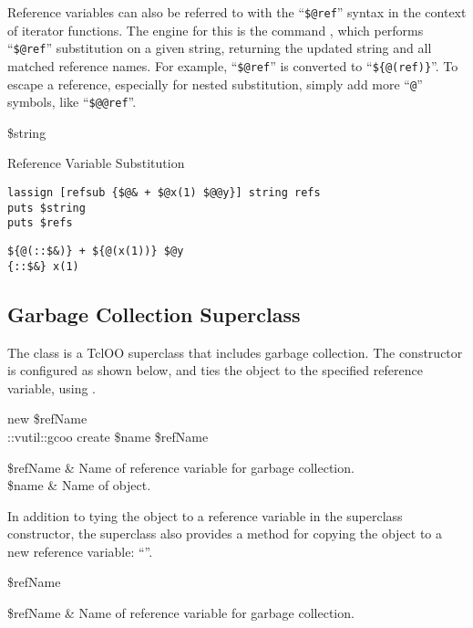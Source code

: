 \documentclass{article}
\begin{document}
Reference variables can also be referred to with the ``\texttt{\$@ref}'' syntax in the context of iterator functions. 
The engine for this is the command , which performs ``\texttt{\$@ref}'' substitution on a given string, returning the updated string and all matched reference names. 
For example, ``\texttt{\$@ref}'' is converted to ``\texttt{\$\{@(ref)\}}''.
To escape a reference, especially for nested substitution, simply add more ``\texttt{@}'' symbols, like ``\texttt{\$@@ref}''.
\begin{syntax}
 \$string
\end{syntax}

\begin{example}{Reference Variable Substitution}
\begin{lstlisting}
lassign [refsub {$@& + $@x(1) $@@y}] string refs
puts $string
puts $refs
\end{lstlisting}
\tcblower
\begin{lstlisting}
${@(::$&)} + ${@(x(1))} $@y
{::$&} x(1)
\end{lstlisting}
\end{example}

\clearpage
\subsection{Garbage Collection Superclass}
The class  is a TclOO superclass that includes garbage collection.
The constructor is configured as shown below, and ties the object to the specified reference variable, using .
\begin{syntax}
 new \$refName \\
::vutil::gcoo create \$name \$refName
\end{syntax}
\begin{args}
\$refName & Name of reference variable for garbage collection. \\
\$name & Name of object.
\end{args}

In addition to tying the object to a reference variable in the superclass constructor, the  superclass also provides a method for copying the object to a new reference variable: ``\texttt{}''.
\begin{syntax}
 \$refName
\end{syntax}
\begin{args}
\$refName & Name of reference variable for garbage collection.
\end{args}
\end{document}
